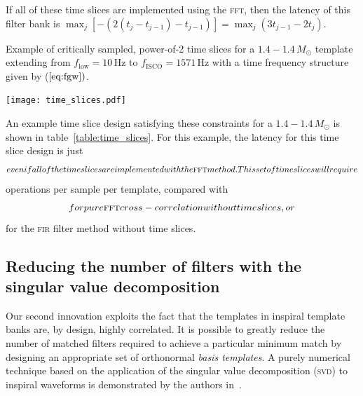 If all of these time slices are implemented using the \textsc{fft}, then the
latency of this filter bank is $\max_j {\left[-\left( 2(t_j - t_{j-1}) -
t_{j-1} \right)\right]} = \max_j \left( 3 t_{j-1} - 2 t_j \right)$.

\begin{table}[h!]
\caption{Example of critically sampled, power-of-2 time slices for a $1.4 - 1.4
\, M_{\odot}$ template extending from $f_\mathrm{low} = 10 \, \mathrm{Hz}$ to
$f_\mathrm{ISCO} = 1571\, \mathrm{Hz}$ with a time frequency structure given by
($\ref{eq:fgw})$.}
\label{table:time_slices}
\begin{minipage}[c]{0.5\textwidth}
\centering
\texttt{[image: time\_slices.pdf]}
\end{minipage}
\begin{minipage}[c]{0.3\textwidth}
\centering

\end{minipage}
\end{table}

An example time slice design satisfying these constraints for a $1.4 - 1.4 \,
M_{\odot}$ is shown in table~\ref{table:time_slices}.  For this example, the
latency for this time slice design is just $$
even if all of the time slices are implemented with the \textsc{fft} method.
This set of time slices will require $$
operations per sample per template, compared with
$$ for pure \textsc{fft} cross-correlation
without time slices, or $$ for the \textsc{fir}
filter method without time slices.

\subsection{Reducing the number of filters with the singular value decomposition}

Our second innovation exploits the fact that the templates in inspiral template
banks are, by design, highly correlated.  It is possible to greatly reduce the
number of matched filters required to achieve a particular minimum match by
designing an appropriate set of orthonormal {\em basis templates}.  A purely
numerical technique based on the application of the singular value
decomposition (\textsc{svd}) to inspiral waveforms is demonstrated by the
authors in~\cite{Cannon:2010p10398}.


